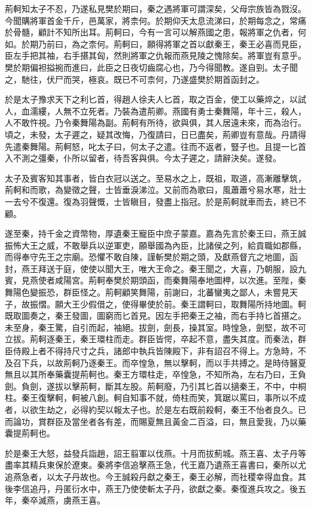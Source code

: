 荊軻知太子不忍，乃遂私見樊於期曰，秦之遇將軍可謂深矣，父母宗族皆為戮沒。今聞購將軍首金千斤，邑萬家，將柰何。於期仰天太息流涕曰，於期每念之，常痛於骨髓，顧計不知所出耳。荊軻曰，今有一言可以解燕國之患，報將軍之仇者，何如。於期乃前曰，為之柰何。荊軻曰，願得將軍之首以獻秦王，秦王必喜而見臣，臣左手把其袖，右手揕其匈，然則將軍之仇報而燕見陵之愧除矣。將軍豈有意乎。樊於期偏袒搤捥而進曰，此臣之日夜切齒腐心也，乃今得聞教。遂自剄。太子聞之，馳往，伏尸而哭，極哀。既已不可柰何，乃遂盛樊於期首函封之。

於是太子豫求天下之利匕首，得趙人徐夫人匕首，取之百金，使工以藥焠之，以試人，血濡縷，人無不立死者。乃裝為遣荊卿。燕國有勇士秦舞陽，年十三，殺人，人不敢忤視。乃令秦舞陽為副。荊軻有所待，欲與俱，其人居遠未來，而為治行。頃之，未發，太子遲之，疑其改悔，乃復請曰，日已盡矣，荊卿豈有意哉。丹請得先遣秦舞陽。荊軻怒，叱太子曰，何太子之遣。往而不返者，豎子也。且提一匕首入不測之彊秦，仆所以留者，待吾客與俱。今太子遲之，請辭決矣。遂發。

太子及賓客知其事者，皆白衣冠以送之。至易水之上，既祖，取道，高漸離擊筑，荊軻和而歌，為變徵之聲，士皆垂淚涕泣。又前而為歌曰，風蕭蕭兮易水寒，壯士一去兮不復還。復為羽聲慨，士皆瞋目，發盡上指冠。於是荊軻就車而去，終已不顧。

遂至秦，持千金之資幣物，厚遺秦王寵臣中庶子蒙嘉。嘉為先言於秦王曰，燕王誠振怖大王之威，不敢舉兵以逆軍吏，願舉國為內臣，比諸侯之列，給貢職如郡縣，而得奉守先王之宗廟。恐懼不敢自陳，謹斬樊於期之頭，及獻燕督亢之地圖，函封，燕王拜送于庭，使使以聞大王，唯大王命之。秦王聞之，大喜，乃朝服，設九賓，見燕使者咸陽宮。荊軻奉樊於期頭函，而秦舞陽奉地圖柙，以次進。至陛，秦舞陽色變振恐，群臣怪之。荊軻顧笑舞陽，前謝曰，北蕃蠻夷之鄙人，未嘗見天子，故振慴。願大王少假借之，使得畢使於前。秦王謂軻曰，取舞陽所持地圖。軻既取圖奏之，秦王發圖，圖窮而匕首見。因左手把秦王之袖，而右手持匕首揕之。未至身，秦王驚，自引而起，袖絕。拔劍，劍長，操其室。時惶急，劍堅，故不可立拔。荊軻逐秦王，秦王環柱而走。群臣皆愕，卒起不意，盡失其度。而秦法，群臣侍殿上者不得持尺寸之兵，諸郎中執兵皆陳殿下，非有詔召不得上。方急時，不及召下兵，以故荊軻乃逐秦王。而卒惶急，無以擊軻，而以手共搏之。是時侍醫夏無且以其所奉藥囊提荊軻也。秦王方環柱走，卒惶急，不知所為，左右乃曰，王負劍。負劍，遂拔以擊荊軻，斷其左股。荊軻廢，乃引其匕首以擿秦王，不中，中桐柱。秦王復擊軻，軻被八創。軻自知事不就，倚柱而笑，箕踞以罵曰，事所以不成者，以欲生劫之，必得約契以報太子也。於是左右既前殺軻，秦王不怡者良久。已而論功，賞群臣及當坐者各有差，而賜夏無且黃金二百溢，曰，無且愛我，乃以藥囊提荊軻也。

於是秦王大怒，益發兵詣趙，詔王翦軍以伐燕。十月而拔薊城。燕王喜、太子丹等盡率其精兵東保於遼東。秦將李信追擊燕王急，代王嘉乃遺燕王喜書曰，秦所以尤追燕急者，以太子丹故也。今王誠殺丹獻之秦王，秦王必解，而社稷幸得血食。其後李信追丹，丹匿衍水中，燕王乃使使斬太子丹，欲獻之秦。秦復進兵攻之。後五年，秦卒滅燕，虜燕王喜。

